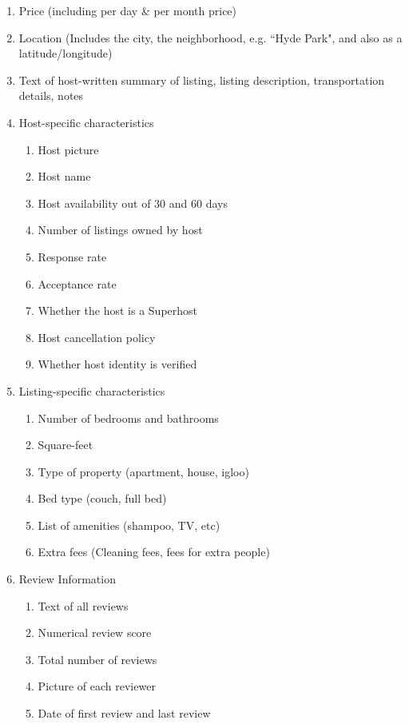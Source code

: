 \documentclass[11pt, oneside]{article}
\begin{document}
\singlespacing
\begin{enumerate}
\item Price (including per day \& per month price)
\item Location (Includes the city, the neighborhood, e.g. ``Hyde Park", and also as a latitude/longitude)
\item Text of host-written summary of listing, listing description, transportation details, notes

\item Host-specific characteristics
\begin{enumerate}
\item Host picture 
\item Host name
\item Host availability out of 30 and 60 days
\item Number of listings owned by host
\item Response rate
\item Acceptance rate
\item Whether the host is a Superhost
\item Host cancellation policy
\item Whether host identity is verified 
\end{enumerate}

\item Listing-specific characteristics
\begin{enumerate}
\item Number of bedrooms and bathrooms
\item Square-feet
\item Type of property (apartment, house, igloo)
\item Bed type (couch, full bed)
\item List of amenities (shampoo, TV, etc)
\item Extra fees (Cleaning fees, fees for extra people)
\end{enumerate}

\item Review Information
\begin{enumerate}
\item Text of all reviews
\item Numerical review score
\item Total number of reviews
\item Picture of each reviewer
\item Date of first review and last review
\end{enumerate}
\end{enumerate}
\doublespacing
\end{document}
